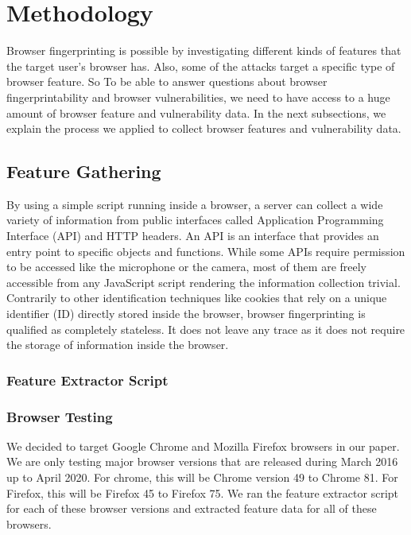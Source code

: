 \section{Methodology}
\label{sec:methodology}
Browser fingerprinting is possible by investigating different kinds of features that the target user's browser has. Also, some of the attacks target a specific type of browser feature. So To be able to answer questions about browser fingerprintability and browser vulnerabilities, we need to have access to a huge amount of browser feature and vulnerability data. In the next subsections, we explain the process we applied to collect browser features and vulnerability data.


\subsection{Feature Gathering}


By using a simple script running inside a browser, a server can collect a wide variety of information from public interfaces called Application Programming Interface (API) and HTTP headers. An API
is an interface that provides an entry point to specific objects and functions. While some APIs require permission to be accessed like the microphone or the camera, most of them are freely accessible from any JavaScript script rendering the information collection trivial. Contrarily to
other identification techniques like cookies that rely on a unique identifier (ID) directly stored inside the browser, browser fingerprinting is qualified as completely stateless. It does not leave any trace as it does not require the storage of information inside the browser.


\subsubsection{Feature Extractor Script}



\subsubsection{Browser Testing}

We decided to target Google Chrome and Mozilla Firefox browsers in our paper. We are only testing major browser versions that are released during March 2016 up to April 2020. For chrome, this will be Chrome version 49 to Chrome 81. For Firefox, this will be Firefox 45 to Firefox 75. We ran the feature extractor script for each of these browser versions and extracted feature data for all of these browsers.

